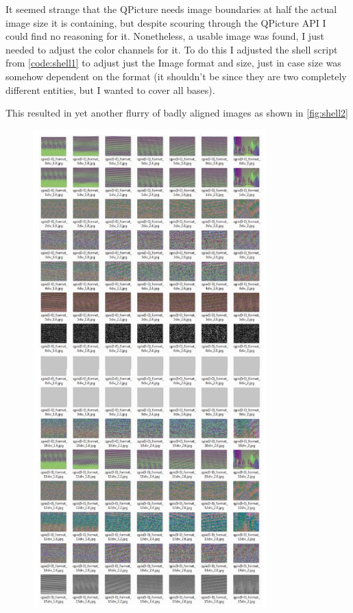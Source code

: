 {{It seemed strange that the QPicture needs image boundaries at half the actual image size it is containing, but despite scouring through the QPicture API I could find no reasoning for it. Nonetheless, a usable image was found, I just needed to adjust the color channels for it.
To do this I adjusted the shell script from \cref{code:shell1} to adjust just the Image format and size, just in case size was somehow dependent on the format (it shouldn’t be since they are two completely different entities, but I wanted to cover all bases).
\begin{frame}{}
	\vspace{10pt}
	
	\vspace{10pt}
\end{frame}
This resulted in yet another flurry of badly aligned images as shown in \cref{fig:shell2}
\begin{figure}
	\begin{center}
		\includegraphics[width=0.8\textwidth]{../images/qpix/shell2}

\end{center}
\end{figure}}}
